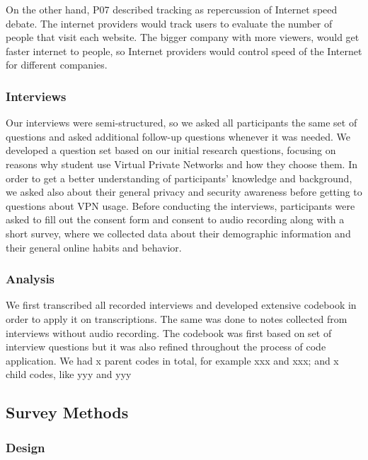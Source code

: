 On the other hand, P07 described tracking as repercussion of Internet speed debate. The internet providers would track users to evaluate the number of people that visit each website. The bigger company with more viewers, would get faster internet to people, so Internet providers would control speed of the Internet for different companies. 



\subsubsection{Interviews}
Our interviews were semi-structured, so we asked all participants the same set of questions and asked additional follow-up questions whenever it was needed. We developed a question set based on our initial research questions, focusing on reasons why student use Virtual Private Networks and how they choose them. In order to get a better understanding of participants’ knowledge and background, we asked also about their general privacy and security awareness before getting to questions about VPN usage. 
Before conducting the interviews, participants were asked to fill out the consent form and consent to audio recording along with a short survey, where we collected data about their demographic information and their general online habits and behavior. 

\subsubsection{Analysis}
We first transcribed all recorded interviews and developed extensive codebook in order to apply it on transcriptions. The same was done to notes collected from interviews without audio recording. The codebook was first based on set of interview questions but it was also refined throughout the process of code application. We had x parent codes in total, for example xxx and xxx; and x child codes, like yyy and yyy

\subsection{Survey Methods}
\subsubsection{Design}

